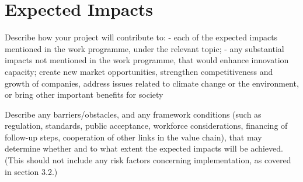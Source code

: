 \section{Expected Impacts}

Describe how your project will contribute to:
 - each of the expected impacts mentioned in the work programme, under the relevant topic;
 - any substantial impacts not mentioned in the work programme, that would enhance innovation capacity; create new market opportunities, strengthen competitiveness and growth of companies, address issues related to climate change or the environment, or bring other important benefits for society

Describe any barriers/obstacles, and any framework conditions (such as regulation, standards, public acceptance, workforce considerations, financing of follow-up steps, cooperation of other links in the value chain), that may determine whether and to what extent the expected impacts will be achieved. (This should not include any risk factors concerning implementation, as covered in section 3.2.)